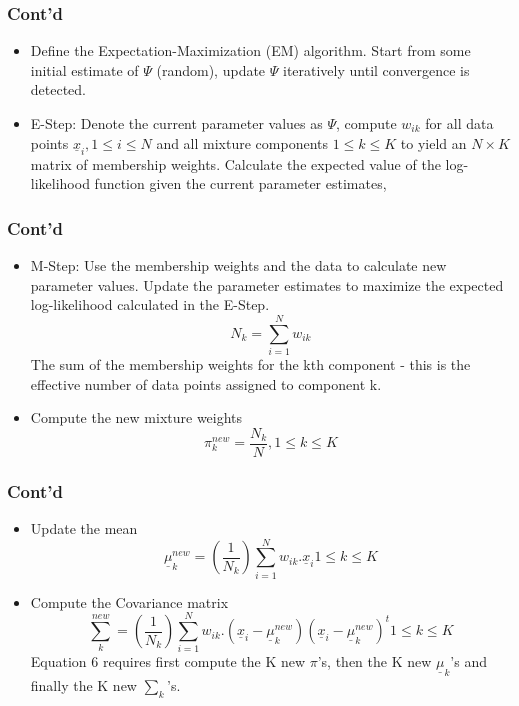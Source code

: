 \documentclass[unknownkeysallowed]{beamer}
\begin{document}
\begin{frame}
	\frametitle{\textbf{Cont'd}}
	\begin{itemize}
		\item Define the Expectation-Maximization (EM) algorithm. Start from some initial estimate of $\Psi$ (random), update $\Psi$ iteratively until convergence is detected.
		\item E-Step: Denote the current parameter values as $\Psi$, compute $w_{ik}$ for all data points $\underline{x}_{i}, 1 \le i \le N$ and all mixture components $1 \le k \le K$ to yield an $N \times K$ matrix of membership weights. Calculate the expected value of the log-likelihood function given the current parameter estimates,
	\end{itemize}
\end{frame}

\begin{frame}
	\frametitle{\textbf{Cont'd}}
	\begin{itemize}
		\item M-Step: Use the membership weights and the data to calculate new parameter values. Update the parameter estimates to maximize the expected log-likelihood calculated in the E-Step. 
		\begin{equation}
			N_{k} = \sum_{i=1}^{N}w_{ik}
		\end{equation}
	The sum of the membership weights for the kth component - this is the effective number of data points assigned to component k.
	\item Compute the new mixture weights
	\begin{equation}
		\pi_{k}^{new} = \frac{N_{k}}{N}, 1 \le k \le K
	\end{equation}
	\end{itemize}
\end{frame}

\begin{frame}
	\frametitle{\textbf{Cont'd}}
	\begin{itemize}
		\item Update the mean
		\begin{equation}
			\underline{\mu}_{k}^{new} = \left(\frac{1}{N_{k}}\right)\sum_{i=1}^{N} w_{ik}.\underline{x}_{i} 1 \le k \le K
		\end{equation}
	\item Compute the Covariance matrix
	\begin{equation}
		\sum_{k}^{new} = \left(\frac{1}{N_{k}}\right)\sum_{i=1}^{N}w_{ik}.\left(\underline{x}_{i}-\underline{\mu}_{k}^{new}\right)(\underline{x}_{i}-\underline{\mu}_{k}^{new})^{t} 1 \le k \le K
	\end{equation}
Equation 6 requires first compute the K new $\pi$'s, then the K new $\underline{\mu}_{k}$'s and finally the K new $\sum_{k}$'s.
	\end{itemize}
\end{frame}
\end{document}
